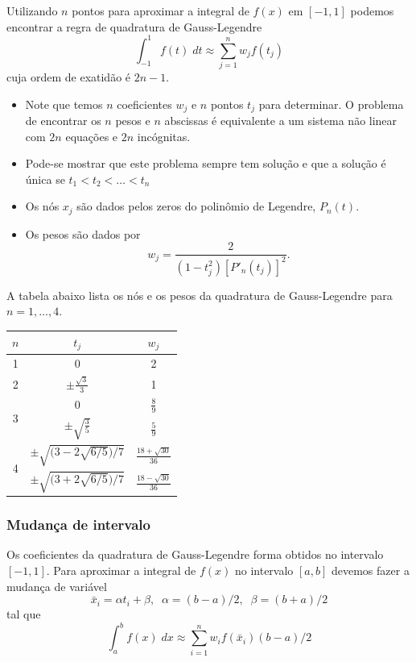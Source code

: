 Utilizando $n$ pontos para aproximar a integral de $f(x)$ em $[-1,1]$ podemos encontrar a regra de quadratura de Gauss-Legendre 
$$\int_{-1}^1 f(t)\;dt \approx \sum_{j=1}^n w_j f(t_j)$$
cuja ordem de exatidão é $2n-1$. 

\begin{itemize}
\item Note que temos $n$ coeficientes $w_j$ e $n$ pontos $t_j$ para determinar. O problema de encontrar os $n$ pesos e $n$ abscissas é equivalente a um sistema não linear com $2n$ equações e $2n$ incógnitas.
\item Pode-se mostrar que este problema sempre tem solução e que a solução é única se $t_1<t_2<\ldots <t_n$
\item Os nós $x_j$ são dados pelos zeros do polinômio de Legendre, $P_n(t)$.
\item Os pesos são dados por
$$w_j = \frac{2}{\left( 1-t_j^2 \right) [P'_n(t_j)]^2}.$$
\end{itemize}

A tabela abaixo lista os nós e os pesos da quadratura de Gauss-Legendre para $n=1,\ldots,4$.

\begin{tabular}{|c|c|c|}\hline
$n$&$t_j$&$w_j$\\\hline
1  & 0 & 2\\\hline
2  & $\displaystyle \pm \frac{\sqrt{3}}{3}$ & 1\\\hline
\multirow{2}{*}{3} &0& $\displaystyle \frac{8}{9}$\\
& $\displaystyle \pm \sqrt{\frac{3}{5}}$ & $\displaystyle \frac{5}{9}$ \\\hline
\multirow{2}{*}{4} & $\displaystyle \pm\sqrt{\Big( 3 - 2\sqrt{6/5} \Big)/7}$ & $\displaystyle \tfrac{18+\sqrt{30}}{36}$\\
& $\displaystyle \pm\sqrt{\Big( 3 + 2\sqrt{6/5} \Big)/7}$ & $\displaystyle \tfrac{18-\sqrt{30}}{36}$\\\hline
\end{tabular}

\subsubsection{Mudança de intervalo}
Os coeficientes da quadratura de Gauss-Legendre forma obtidos no intervalo $[-1,1]$. Para aproximar a integral de $f(x)$ no intervalo $[a,b]$ devemos fazer a mudança de variável
$$ \bar{x}_i=\alpha t_i+ \beta , \;\; \alpha =(b-a)/2, \;\; \beta = (b+a)/2 $$
tal que 
$$
 \int_{a}^{b} f(x) \; dx \approx \sum_{i=1}^n w_i f( \bar{x}_i ) (b-a)/2
$$

